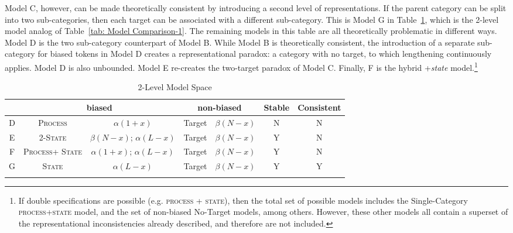 Model C, however, can be made theoretically consistent by introducing
a second level of representations. If the parent category can be split
into two sub-categories, then each target can be associated with a
different sub-category. This is Model G in Table~\ref{tab: Model Comparison},
which is the 2-level model analog of Table~\ref{tab: Model Comparison-1}.
The remaining models in this table are all theoretically problematic
in different ways. Model D is the two sub-category counterpart of
Model B. While Model B is theoretically consistent, the introduction
of a separate sub-category for biased tokens in Model D creates a
representational paradox: a category with no target, to which lengthening
continuously applies. Model D is also unbounded. Model E re-creates
the two-target paradox of Model C. Finally, F is the hybrid +\emph{state}
model.\footnote{If double specifications are possible (e.g. \textsc{process} + \textsc{state}),
then the total set of possible models includes the Single-Category
\textsc{process}+\textsc{state} model, and the set of non-biased No-Target
models, among others. However, these other models all contain a superset
of the representational inconsistencies already described, and therefore
are not included.}

\begin{table}[h]\footnotesize
\caption{2-Level Model Space\label{tab: Model Comparison}}
\begin{tabular}{ccccccc}
\lsptoprule
 & \multicolumn{2}{c}{biased} & \multicolumn{2}{c}{non-biased} & Stable & Consistent\tabularnewline\midrule
D & \textsc{Process} & $\alpha(1+x)$ & Target & $\beta(N-x)$ & N & N\tabularnewline
E & \textsc{2-State} & $\beta(N-x)$; $\alpha(L-x)$ & Target & $\beta(N-x)$ & Y & N\tabularnewline
F & \textsc{Process+ State} & $\alpha(1+x)$; $\alpha(L-x)$ & Target & $\beta(N-x)$ & Y & N\tabularnewline
G & \textsc{State} & $\alpha(L-x)$ & Target & $\beta(N-x)$ & Y & Y\tabularnewline
\lspbottomrule
\end{tabular}
\end{table}

